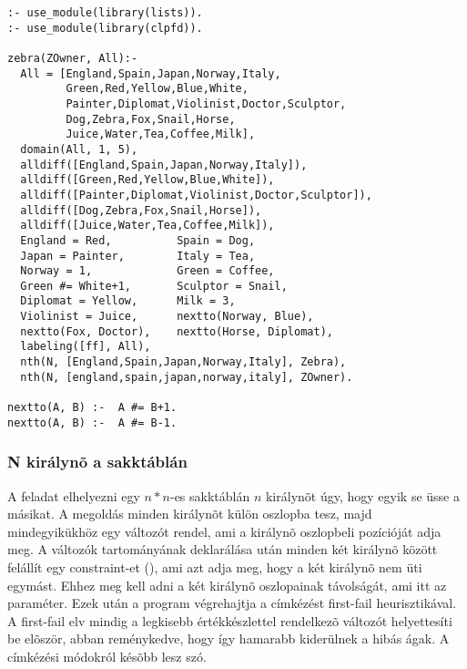 \begin{verbatim}
:- use_module(library(lists)).
:- use_module(library(clpfd)).

zebra(ZOwner, All):-
  All = [England,Spain,Japan,Norway,Italy,
         Green,Red,Yellow,Blue,White,
         Painter,Diplomat,Violinist,Doctor,Sculptor,
         Dog,Zebra,Fox,Snail,Horse,
         Juice,Water,Tea,Coffee,Milk],
  domain(All, 1, 5),
  alldiff([England,Spain,Japan,Norway,Italy]),
  alldiff([Green,Red,Yellow,Blue,White]),
  alldiff([Painter,Diplomat,Violinist,Doctor,Sculptor]),
  alldiff([Dog,Zebra,Fox,Snail,Horse]),
  alldiff([Juice,Water,Tea,Coffee,Milk]),
  England = Red,          Spain = Dog,
  Japan = Painter,        Italy = Tea,
  Norway = 1,             Green = Coffee,
  Green #= White+1,       Sculptor = Snail,
  Diplomat = Yellow,      Milk = 3,
  Violinist = Juice,      nextto(Norway, Blue),
  nextto(Fox, Doctor),    nextto(Horse, Diplomat),
  labeling([ff], All),
  nth(N, [England,Spain,Japan,Norway,Italy], Zebra),
  nth(N, [england,spain,japan,norway,italy], ZOwner).

nextto(A, B) :-  A #= B+1.
nextto(A, B) :-  A #= B-1.
\end{verbatim}

\subsubsection{N királynõ a sakktáblán}

A feladat elhelyezni egy $n * n$-es sakktáblán $n$ királynõt úgy, hogy
egyik se üsse a másikat.
\br
A megoldás minden királynõt külön oszlopba tesz, majd mindegyikükhöz
egy változót rendel, ami a királynõ oszlopbeli pozícióját adja meg. A
változók tartományának deklarálása után minden két királynõ között
felállít egy constraint-et (), ami azt adja meg, hogy
a két királynõ nem üti egymást. Ehhez meg kell adni a két királynõ
oszlopainak távolságát, ami itt az  paraméter. Ezek után a
program végrehajtja a címkézést first-fail heurisztikával. A first-fail
elv mindig a legkisebb értékkészlettel rendelkezõ változót helyettesíti
be elõször, abban reménykedve, hogy így hamarabb kiderülnek a hibás ágak.
A címkézési módokról késõbb lesz szó.

\label{no:threat}

